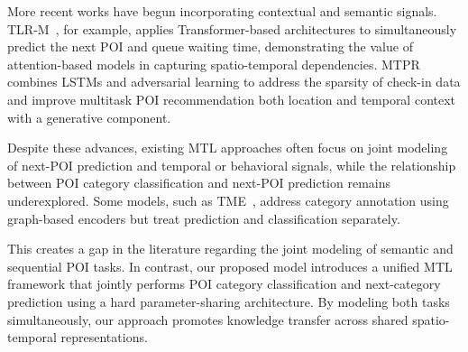More recent works have begun incorporating contextual and semantic signals. TLR-M~\cite{Halder2021}, for example, applies Transformer-based architectures to simultaneously predict the next POI and queue waiting time, demonstrating the value of attention-based models in capturing spatio-temporal dependencies. MTPR~\cite{Xia2020} combines LSTMs and adversarial learning to address the sparsity of check-in data and improve multitask POI recommendation both location and temporal context with a generative component.

Despite these advances, existing MTL approaches often focus on joint modeling of next-POI prediction and temporal or behavioral signals, while the relationship between POI category classification and next-POI prediction remains underexplored. Some models, such as TME~\cite{Xu2023}, address category annotation using graph-based encoders but treat prediction and classification separately.

This creates a gap in the literature regarding the joint modeling of semantic and sequential POI tasks. In contrast, our proposed model introduces a unified MTL framework that jointly performs POI category classification and next-category prediction using a hard parameter-sharing architecture. By modeling both tasks simultaneously, our approach promotes knowledge transfer across shared spatio-temporal representations.
